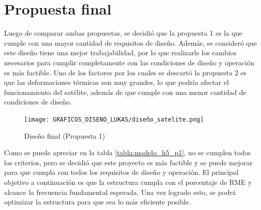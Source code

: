 \newpage
\section{Propuesta final}

Luego de comparar ambas propuestas, se decidió que la propuesta 1 es la que cumple con una mayor cantidad de requisitos de diseño. Además, se consideró que este diseño tiene una mejor trabajabilidad, por lo que realizarle los cambios necesarios para cumplir completamente con las condiciones de diseño y operación es más factible. Uno de los factores por los cuales se descartó la propuesta 2 es que las deformaciones térmicas son muy grandes, lo que podría afectar el funcionamiento del satélite, además de que cumple con una menor cantidad de condiciones de diseño.

\begin{figure}[H]
    \centering
    \texttt{[image: GRAFICOS\_DISENO\_LUKAS/diseño\_satelite.png]}
    \caption{Diseño final (Propuesta 1)}
    \label{fig:propuesta1}
\end{figure}

Como se puede apreciar en la tabla \ref{tabla:modelo_h5_p1}, no se cumplen todos los criterios, pero se decidió que este proyecto es más factible y se puede mejorar para que cumpla con todos los requisitos de diseño y operación. El principal objetivo a continuación es que la estructura cumpla con el porcentaje de RME y alcance la frecuencia fundamental esperada. Una vez logrado esto, se podrá optimizar la estructura para que sea lo más eficiente posible.

